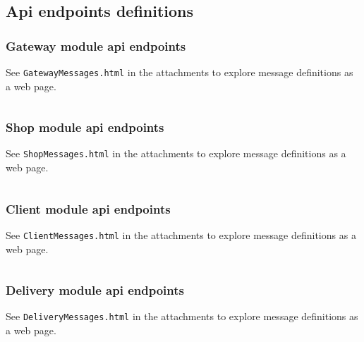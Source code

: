 \documentclass[english]{article}
\begin{document}
\subsection{Api endpoints definitions}

\subsubsection{Gateway module api endpoints}
See \texttt{GatewayMessages.html} in the attachments to explore message definitions as a web page.
\vspace{10mm}

\inputminted[label={GatewayMessages.raml}]{YAML}{{api-specification/GatewayMessages.raml}}

\subsubsection{Shop module api endpoints}
See \texttt{ShopMessages.html} in the attachments to explore message definitions as a web page.
\vspace{10mm}
\inputminted[label={ShopMessages.raml}]{YAML}{{api-specification/ShopMessages.raml}}

\subsubsection{Client module api endpoints}
See \texttt{ClientMessages.html} in the attachments to explore message definitions as a web page.
\vspace{10mm}
\inputminted[label={ClientMessages.raml}]{YAML}{{api-specification/ClientMessages.raml}}

\subsubsection{Delivery module api endpoints}
See \texttt{DeliveryMessages.html} in the attachments to explore message definitions as a web page.
\vspace{10mm}
\inputminted[label={DeliveryMessages.raml}]{YAML}{{api-specification/DeliveryMessages.raml}}
\end{document}
